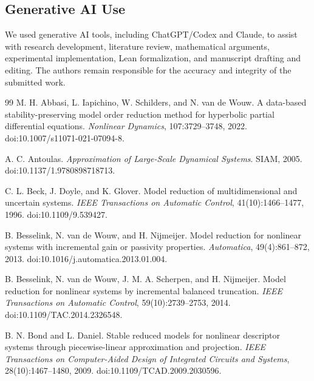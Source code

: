 \documentclass{l4dc2027}
\begin{document}
\label{main-text-end}

\subsection*{Generative AI Use}
We used generative AI tools, including ChatGPT/Codex and Claude, to assist with research development, literature review, mathematical arguments, experimental implementation, Lean formalization, and manuscript drafting and editing.
The authors remain responsible for the accuracy and integrity of the submitted work.

\clearpage
\begin{thebibliography}{99}
M. H. Abbasi, L. Iapichino, W. Schilders, and N. van de Wouw.
\newblock A data-based stability-preserving model order reduction method for hyperbolic partial differential equations.
\newblock \emph{Nonlinear Dynamics}, 107:3729--3748, 2022.
\newblock doi:10.1007/s11071-021-07094-8.

A. C. Antoulas.
\newblock \emph{Approximation of Large-Scale Dynamical Systems}.
\newblock SIAM, 2005. doi:10.1137/1.9780898718713.

C. L. Beck, J. Doyle, and K. Glover.
\newblock Model reduction of multidimensional and uncertain systems.
\newblock \emph{IEEE Transactions on Automatic Control}, 41(10):1466--1477, 1996.
\newblock doi:10.1109/9.539427.

B. Besselink, N. van de Wouw, and H. Nijmeijer.
\newblock Model reduction for nonlinear systems with incremental gain or passivity properties.
\newblock \emph{Automatica}, 49(4):861--872, 2013.
\newblock doi:10.1016/j.automatica.2013.01.004.

B. Besselink, N. van de Wouw, J. M. A. Scherpen, and H. Nijmeijer.
\newblock Model reduction for nonlinear systems by incremental balanced truncation.
\newblock \emph{IEEE Transactions on Automatic Control}, 59(10):2739--2753, 2014.
\newblock doi:10.1109/TAC.2014.2326548.

B. N. Bond and L. Daniel.
\newblock Stable reduced models for nonlinear descriptor systems through piecewise-linear approximation and projection.
\newblock \emph{IEEE Transactions on Computer-Aided Design of Integrated Circuits and Systems}, 28(10):1467--1480, 2009.
\newblock doi:10.1109/TCAD.2009.2030596.


\end{thebibliography}
\end{document}
